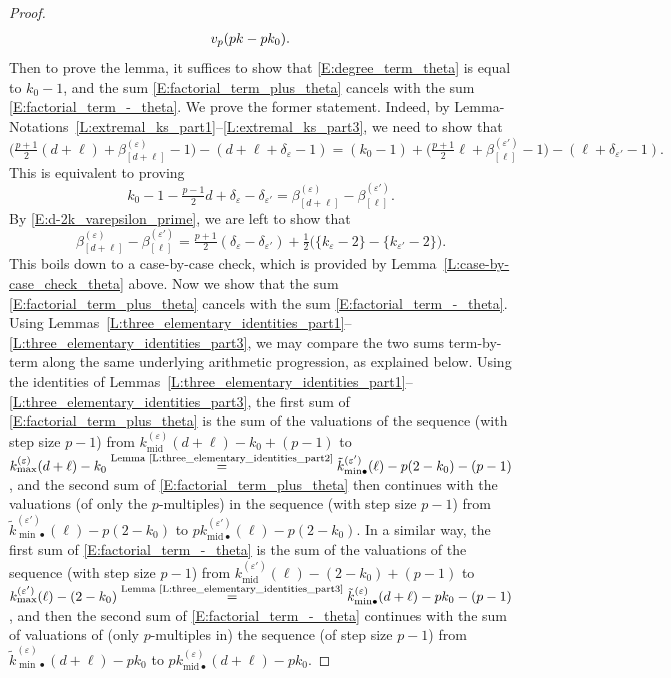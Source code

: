 \begin{proof}
\begin{align}
    \hspace{-15pt}v_p(pk-pk_0).
    \end{align}
    Then to prove the lemma, it suffices to show that \eqref{E:degree_term_theta} is equal to $k_0-1$, and the sum \eqref{E:factorial_term_plus_theta} cancels with the sum \eqref{E:factorial_term_-_theta}.
    We prove the former statement. Indeed, by Lemma-Notations~\ref{L:extremal_ks_part1}--\ref{L:extremal_ks_part3}, we need to show that
    $$
    \big(\tfrac{p+1}2 (d+\ell) + \beta_{[d+\ell]}^{(\varepsilon)}-1\big) - (d+\ell + \delta_\varepsilon -1)  = (k_0-1) + \big(\tfrac{p+1}2 \ell + \beta_{[\ell]}^{(\varepsilon')}-1\big) - (\ell + \delta_{\varepsilon'} -1).
    $$
    This is equivalent to proving
    \begin{equation}
    k_0-1-\tfrac{p-1}2 d +\delta_\varepsilon - \delta_{\varepsilon'} = \beta_{[d+\ell]}^{(\varepsilon)} - \beta_{[\ell]}^{(\varepsilon')}.
    \end{equation}
    By \eqref{E:d-2k_varepsilon_prime}, we are left to show that
    $$
    \beta_{[d+\ell]}^{(\varepsilon)} - \beta_{[\ell]}^{(\varepsilon')} = \tfrac{p+1}2( \delta_\varepsilon -\delta_{\varepsilon'}) +\tfrac 12\big( \{k _\varepsilon -2\} - \{k_{\varepsilon '}-2\}\big).
    $$
    This boils down to a case-by-case check, which is provided by Lemma~\ref{L:case-by-case_check_theta} above.
    Now we show that the sum \eqref{E:factorial_term_plus_theta} cancels with the sum \eqref{E:factorial_term_-_theta}.
    Using Lemmas~\ref{L:three_elementary_identities_part1}--\ref{L:three_elementary_identities_part3}, we may compare the two sums term-by-term along the same underlying arithmetic progression, as explained below.
    Using the identities of Lemmas~\ref{L:three_elementary_identities_part1}--\ref{L:three_elementary_identities_part3}, the first sum of \eqref{E:factorial_term_plus_theta} is the sum of the  valuations of the sequence (with step size $p-1$) from $ k^{(\varepsilon)}_{{\mathrm{mid}}}(d+\ell) - k_0+(p-1)$ to $k^{(\varepsilon)}_{\max}(d+\ell) - k_0 \stackrel{\text{Lemma~\ref{L:three_elementary_identities_part2}}}{=} \tilde k_{{\min}\bullet}^{(\varepsilon')}(\ell) -p(2-k_0) - (p-1)$, and the second sum of \eqref{E:factorial_term_plus_theta} then continues with the valuations (of only the $p$-multiples) in the sequence (with step size $p-1$) from $\tilde k_{{\min}\bullet}^{(\varepsilon')}(\ell) -p(2-k_0)$ to $pk_{{\mathrm{mid}}\bullet}^{(\varepsilon')}(\ell) - p(2-k_0)$.
    In a similar way, the first sum of \eqref{E:factorial_term_-_theta} is the sum of the  valuations of the sequence (with step size $p-1$) from $ k^{(\varepsilon')}_{{\mathrm{mid}}}(\ell) - (2-k_0)+(p-1)$ to $k^{(\varepsilon')}_{\max}(\ell) - (2-k_0) \stackrel{\text{Lemma~\ref{L:three_elementary_identities_part3}}}{=} \tilde k_{{\min}\bullet}^{(\varepsilon)}(d+\ell) -pk_0-(p-1)$, and then the second sum of \eqref{E:factorial_term_-_theta} continues with the sum of valuations of (only $p$-multiples in) the sequence (of step size $p-1$) from $\tilde k_{{\min}\bullet}^{(\varepsilon)}(d+\ell) -pk_0$ to $pk_{{\mathrm{mid}}\bullet}^{(\varepsilon)}(d+\ell) - pk_0$.

\end{proof}
